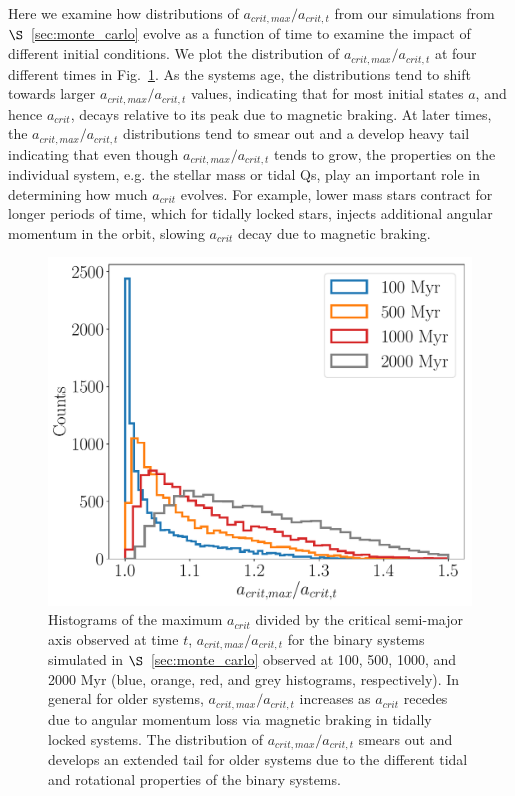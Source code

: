 Here we examine how distributions of $a_{crit,max}/a_{crit,t}$ from our simulations from $\S$~\ref{sec:monte_carlo} evolve as a function of time to examine the impact of different initial conditions.  We plot the distribution of $a_{crit,max}/a_{crit,t}$ at four different times in Fig.~\ref{fig:acrit_hist}.  As the systems age, the distributions tend to shift towards larger $a_{crit,max}/a_{crit,t}$ values, indicating that for most initial states $a$, and hence $a_{crit}$, decays relative to its peak due to magnetic braking.  At later times, the $a_{crit,max}/a_{crit,t}$ distributions tend to smear out and a develop heavy tail indicating that even though $a_{crit,max}/a_{crit,t}$ tends to grow, the properties on the individual system, e.g. the stellar mass or tidal Qs, play an important role in determining how much $a_{crit}$ evolves.  For example, lower mass stars contract for longer periods of time, which for tidally locked stars, injects additional angular momentum in the orbit, slowing $a_{crit}$ decay due to magnetic braking.

\begin{figure}[h]
	\includegraphics[width=\columnwidth]{acrit_hist.pdf}
    \caption{Histograms of the maximum $a_{crit}$ divided by the critical semi-major axis observed at time $t$, $a_{crit,max}/a_{crit,t}$ for the binary systems simulated in $\S$~\ref{sec:monte_carlo} observed at 100, 500, 1000, and 2000 Myr (blue, orange, red, and grey histograms, respectively).  In general for older systems, $a_{crit,max}/a_{crit,t}$ increases as $a_{crit}$ recedes due to angular momentum loss via magnetic braking in tidally locked systems.  The distribution of $a_{crit,max}/a_{crit,t}$ smears out and develops an extended tail for older systems due to the different tidal and rotational properties of the binary systems.}
    \label{fig:acrit_hist}
\end{figure}

